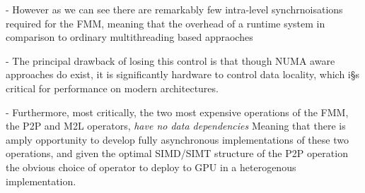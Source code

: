 - However as we can see there are remarkably few intra-level synchrnoisations required for the FMM, meaning that the overhead of a runtime system in comparison to ordinary multithreading based appraoches

- The principal drawback of losing this control is that though NUMA aware approaches do exist, it is significantly hardware to control data locality, which i§s critical for performance on modern architectures.

- Furthermore, most critically, the two most expensive operations of the FMM, the P2P and M2L operators, \textit{have no data dependencies} Meaning that there is amply opportunity to develop fully asynchronous implementations of these two operations, and given the optimal SIMD/SIMT structure of the P2P operation the obvious choice of operator to deploy to GPU in a heterogenous implementation.


